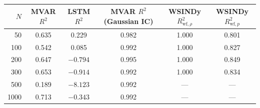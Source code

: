 \begin{tabular}{rccccc}
\toprule
$N$ & \textbf{MVAR} $R^2$ & \textbf{LSTM} $R^2$ & \textbf{MVAR} $R^2$ (Gaussian IC) & \textbf{WSINDy} $R^2_{\mathrm{wf},\rho}$ & \textbf{WSINDy} $R^2_{\mathrm{wf},p}$ \\
\midrule
50 & 0.635 & 0.229 & 0.982 & 1.000 & 0.801 \\
100 & 0.542 & 0.085 & 0.992 & 1.000 & 0.827 \\
200 & 0.647 & $-0.794$ & 0.995 & 1.000 & 0.849 \\
300 & 0.653 & $-0.914$ & 0.992 & 1.000 & 0.834 \\
500 & 0.189 & $-8.123$ & 0.992 & --- & --- \\
1000 & 0.713 & $-0.343$ & 0.992 & --- & --- \\
\bottomrule
\end{tabular}
